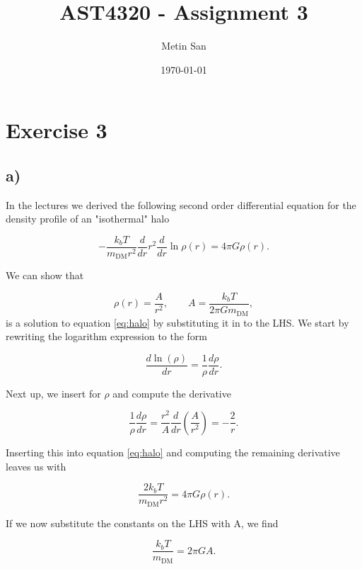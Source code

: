 \documentclass[a4paper]{article}
\title{AST4320 - Assignment 3}
\author{Metin San}
\date{\today}
\begin{document}
\maketitle

\section*{Exercise 3}
\subsection*{a)}

In the lectures we derived the following second order differential equation for the density
profile of an "isothermal" halo

\begin{equation}\label{eq:halo}
    -\frac{k_b T}{m_{\text{DM}}r^2} \frac{d}{dr} r^2 \frac{d}{dr} \ln{\rho(r)} = 4\pi G \rho(r).
\end{equation}

\noindent We can show that

\begin{equation}\label{eq:halodef}
    \rho(r) = \frac{A}{r^2}, \qquad A = \frac{k_bT}{2\pi G m_{\text{DM}}},
\end{equation}
is a solution to equation \eqref{eq:halo} by substituting it in to the LHS.
We start by rewriting the logarithm expression to the form

\begin{equation*}
    \frac{d \ln(\rho)}{dr} = \frac{1}{\rho} \frac{d \rho}{dr}.
\end{equation*}

\noindent Next up, we insert for $\rho$ and compute the derivative

\begin{equation*}
    \frac{1}{\rho} \frac{d \rho}{dr} = \frac{r^2}{A} \frac{d}{dr} \left( \frac{A}{r^2} \right) = -\frac{2}{r}. 
\end{equation*}

\noindent Inserting this into equation \eqref{eq:halo} and computing the remaining derivative
leaves us with

\begin{equation}\label{eq:halosub}
    \frac{2k_b T}{m_{\text{DM}}r^2} = 4\pi G \rho(r).
\end{equation}

\noindent If we now substitute the constants on the LHS with A, we find

\begin{equation*}
    \frac{k_b T}{m_\text{DM}} = 2\pi G A.
\end{equation*}
\end{document}

